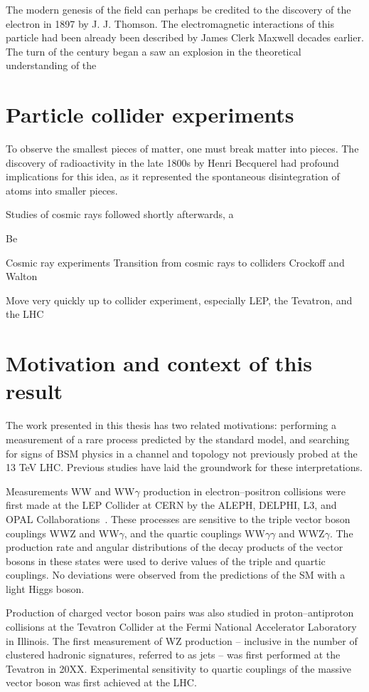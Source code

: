 The modern genesis of the field can perhaps be credited to 
the discovery of the electron in 1897 by J. J. Thomson.
The electromagnetic interactions of this particle had been 
already been described by James Clerk Maxwell decades earlier.
The turn of the century began a saw an explosion in the theoretical
understanding of the 

\section{Particle collider experiments}

To observe the smallest pieces of matter, one must break matter into pieces.
The discovery of radioactivity in the late 1800s by Henri Becquerel had
profound implications for this idea, as it represented the spontaneous
disintegration of atoms into smaller pieces.

Studies of cosmic rays followed shortly afterwards, a


Be

Cosmic ray experiments
Transition from cosmic rays to colliders
Crockoff and Walton

Move very quickly up to collider experiment, especially LEP,
the Tevatron, and the LHC
\section{Motivation and context of this result}
The work presented in this thesis
has two related motivations: performing a measurement of a rare
process predicted by the standard model, and searching for signs of 
BSM physics in a channel and topology not previously probed at the 13 TeV LHC.
Previous studies have laid the groundwork for these interpretations.

Measurements WW and WW$\gamma$ production in electron--positron collisions
were first made at the LEP
Collider at CERN by the ALEPH, DELPHI, L3, and OPAL Collaborations~\cite{LEP-2}.
These processes are sensitive to the triple vector boson couplings
WWZ and WW$\gamma$, and the quartic couplings WW$\gamma\gamma$
and WWZ$\gamma$. The production rate and angular distributions of the decay
products of the vector bosons in these states were used to derive values 
of the triple and quartic couplings. No deviations were observed from the 
predictions of the SM with a light Higgs boson.

Production of charged vector boson pairs was also studied in proton--antiproton
collisions at the Tevatron Collider at the Fermi National Accelerator Laboratory
in Illinois. The first measurement of WZ production -- inclusive in the
number of clustered hadronic signatures, referred to as jets -- was
first performed at the Tevatron in 20XX. 
Experimental sensitivity to quartic couplings of the massive vector boson 
was first achieved at the LHC.

